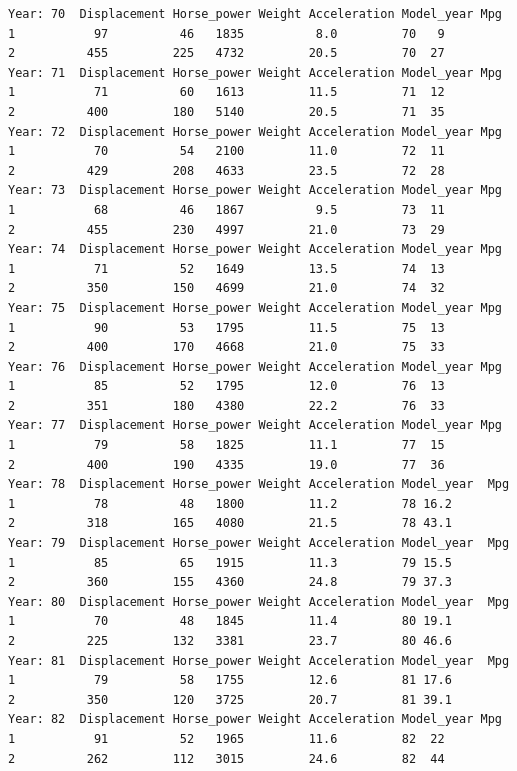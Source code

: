 \documentclass[
]{article}
\begin{document}
\begin{verbatim}
Year: 70  Displacement Horse_power Weight Acceleration Model_year Mpg
1           97          46   1835          8.0         70   9
2          455         225   4732         20.5         70  27
Year: 71  Displacement Horse_power Weight Acceleration Model_year Mpg
1           71          60   1613         11.5         71  12
2          400         180   5140         20.5         71  35
Year: 72  Displacement Horse_power Weight Acceleration Model_year Mpg
1           70          54   2100         11.0         72  11
2          429         208   4633         23.5         72  28
Year: 73  Displacement Horse_power Weight Acceleration Model_year Mpg
1           68          46   1867          9.5         73  11
2          455         230   4997         21.0         73  29
Year: 74  Displacement Horse_power Weight Acceleration Model_year Mpg
1           71          52   1649         13.5         74  13
2          350         150   4699         21.0         74  32
Year: 75  Displacement Horse_power Weight Acceleration Model_year Mpg
1           90          53   1795         11.5         75  13
2          400         170   4668         21.0         75  33
Year: 76  Displacement Horse_power Weight Acceleration Model_year Mpg
1           85          52   1795         12.0         76  13
2          351         180   4380         22.2         76  33
Year: 77  Displacement Horse_power Weight Acceleration Model_year Mpg
1           79          58   1825         11.1         77  15
2          400         190   4335         19.0         77  36
Year: 78  Displacement Horse_power Weight Acceleration Model_year  Mpg
1           78          48   1800         11.2         78 16.2
2          318         165   4080         21.5         78 43.1
Year: 79  Displacement Horse_power Weight Acceleration Model_year  Mpg
1           85          65   1915         11.3         79 15.5
2          360         155   4360         24.8         79 37.3
Year: 80  Displacement Horse_power Weight Acceleration Model_year  Mpg
1           70          48   1845         11.4         80 19.1
2          225         132   3381         23.7         80 46.6
Year: 81  Displacement Horse_power Weight Acceleration Model_year  Mpg
1           79          58   1755         12.6         81 17.6
2          350         120   3725         20.7         81 39.1
Year: 82  Displacement Horse_power Weight Acceleration Model_year Mpg
1           91          52   1965         11.6         82  22
2          262         112   3015         24.6         82  44
\end{verbatim}
\end{document}
